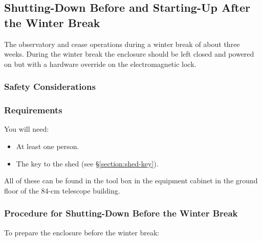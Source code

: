 \subsection{Shutting-Down Before and Starting-Up After the Winter Break}
\label{section:enclosure-manual-winter-break}

The observatory and {\projectname} cease operations during a winter break of about three weeks. During the winter break the enclosure should be left closed and powered on but with a hardware override on the electromagnetic lock.

\subsubsection{Safety Considerations}


\subsubsection{Requirements}

You will need:
\begin{itemize}
\item At least one person.
\item The key to the shed (see \S\ref{section:shed-key}).
\end{itemize}
All of these can be found in the tool box in the {\projectname} equipment cabinet in the ground floor of the 84-cm telescope building.

\subsubsection{Procedure for Shutting-Down Before the Winter Break}

To prepare the enclosure before the winter break:

